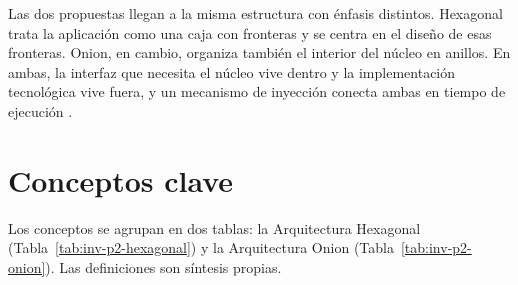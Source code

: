 Las dos propuestas llegan a la misma estructura con énfasis distintos. Hexagonal trata la aplicación como una caja con fronteras y se centra en el diseño de esas fronteras. Onion, en cambio, organiza también el interior del núcleo en anillos. En ambas, la interfaz que necesita el núcleo vive dentro y la implementación tecnológica vive fuera, y un mecanismo de inyección conecta ambas en tiempo de ejecución \parencites[«Sample Code»]{cockburn2005}{palermo2008b}.

\section{Conceptos clave}

Los conceptos se agrupan en dos tablas: la Arquitectura Hexagonal (Tabla~\ref{tab:inv-p2-hexagonal}) y la Arquitectura Onion (Tabla~\ref{tab:inv-p2-onion}). Las definiciones son síntesis propias.

